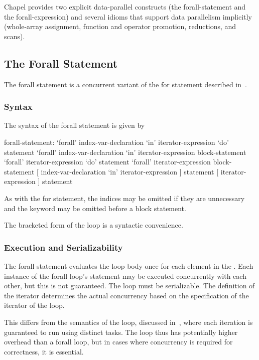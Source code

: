 \label{Data_Parallelism}

Chapel provides two explicit data-parallel constructs (the
forall-statement and the forall-expression) and several idioms that
support data parallelism implicitly (whole-array assignment, function
and operator promotion, reductions, and scans).

\subsection{The Forall Statement}
\label{Forall}

The forall statement is a concurrent variant of the for statement
described in~.

\subsubsection{Syntax}
\label{forall_syntax}

The syntax of the forall statement is given by
\begin{syntax}
forall-statement:
  `forall' index-var-declaration `in' iterator-expression `do' statement
  `forall' index-var-declaration `in' iterator-expression block-statement
  `forall' iterator-expression `do' statement
  `forall' iterator-expression block-statement
  [ index-var-declaration `in' iterator-expression ] statement
  [ iterator-expression ] statement
\end{syntax}
As with the for statement, the indices may be omitted if they are
unnecessary and the  keyword may be omitted before a block
statement.

The bracketed form of the loop is a syntactic convenience.

\subsubsection{Execution and Serializability}
\label{forall_semantics}

The forall statement evaluates the loop body once for each element in
the .  Each instance of the forall loop's
statement may be executed concurrently with each other, but this is
not guaranteed.  The loop must be serializable.  The definition of the
iterator determines the actual concurrency based on the specification
of the iterator of the loop.

This differs from the semantics of the  loop, discussed
in~, where each iteration is guaranteed to run using
distinct tasks.  The  loop thus has potentially higher
overhead than a forall loop, but in cases where concurrency is
required for correctness, it is essential.

